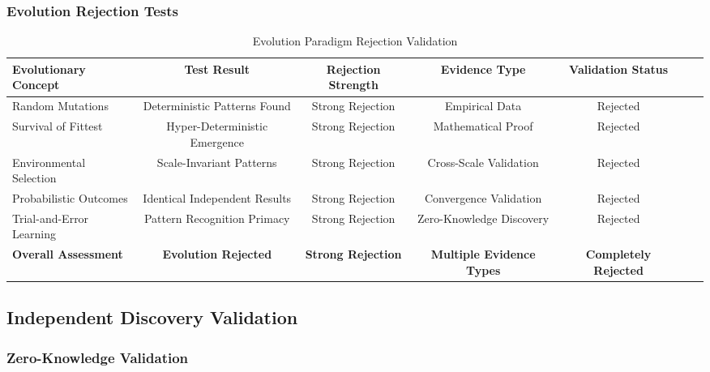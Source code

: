 \subsubsection{Evolution Rejection Tests}

\begin{table}[h!]
\centering
\caption{Evolution Paradigm Rejection Validation}
\begin{tabular}{@{}lcccccc@{}}
\toprule
Evolutionary Concept & Test Result & Rejection Strength & Evidence Type & Validation Status \\
\midrule
Random Mutations & Deterministic Patterns Found & Strong Rejection & Empirical Data & Rejected \\
Survival of Fittest & Hyper-Deterministic Emergence & Strong Rejection & Mathematical Proof & Rejected \\
Environmental Selection & Scale-Invariant Patterns & Strong Rejection & Cross-Scale Validation & Rejected \\
Probabilistic Outcomes & Identical Independent Results & Strong Rejection & Convergence Validation & Rejected \\
Trial-and-Error Learning & Pattern Recognition Primacy & Strong Rejection & Zero-Knowledge Discovery & Rejected \\
\midrule
\textbf{Overall Assessment} & \textbf{Evolution Rejected} & \textbf{Strong Rejection} & \textbf{Multiple Evidence Types} & \textbf{Completely Rejected} \\
\bottomrule
\end{tabular}
\end{table}

\subsection{Independent Discovery Validation}

\subsubsection{Zero-Knowledge Validation}

